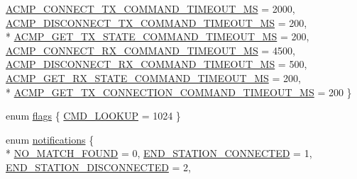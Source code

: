 \begin{DoxyCompactItemize}
\hyperlink{namespaceavdecc__lib_a5672955abd1a38146bde28647367857ead2c9cdd3767fdcfc7973bffe6fad27e6}{A\+C\+M\+P\+\_\+\+C\+O\+N\+N\+E\+C\+T\+\_\+\+T\+X\+\_\+\+C\+O\+M\+M\+A\+N\+D\+\_\+\+T\+I\+M\+E\+O\+U\+T\+\_\+\+MS} = 2000, 
\hyperlink{namespaceavdecc__lib_a5672955abd1a38146bde28647367857ea119f46688bfcc69a5bb7c9887a0fbe7e}{A\+C\+M\+P\+\_\+\+D\+I\+S\+C\+O\+N\+N\+E\+C\+T\+\_\+\+T\+X\+\_\+\+C\+O\+M\+M\+A\+N\+D\+\_\+\+T\+I\+M\+E\+O\+U\+T\+\_\+\+MS} = 200, 
\\*
\hyperlink{namespaceavdecc__lib_a5672955abd1a38146bde28647367857ea429b49b68e80bdbcc480d2b2ba663771}{A\+C\+M\+P\+\_\+\+G\+E\+T\+\_\+\+T\+X\+\_\+\+S\+T\+A\+T\+E\+\_\+\+C\+O\+M\+M\+A\+N\+D\+\_\+\+T\+I\+M\+E\+O\+U\+T\+\_\+\+MS} = 200, 
\hyperlink{namespaceavdecc__lib_a5672955abd1a38146bde28647367857ea6c03d3112f3139618f56b82329572bc4}{A\+C\+M\+P\+\_\+\+C\+O\+N\+N\+E\+C\+T\+\_\+\+R\+X\+\_\+\+C\+O\+M\+M\+A\+N\+D\+\_\+\+T\+I\+M\+E\+O\+U\+T\+\_\+\+MS} = 4500, 
\hyperlink{namespaceavdecc__lib_a5672955abd1a38146bde28647367857eaeaaa3d4bbcbc28fb10d8511ac3d590cc}{A\+C\+M\+P\+\_\+\+D\+I\+S\+C\+O\+N\+N\+E\+C\+T\+\_\+\+R\+X\+\_\+\+C\+O\+M\+M\+A\+N\+D\+\_\+\+T\+I\+M\+E\+O\+U\+T\+\_\+\+MS} = 500, 
\hyperlink{namespaceavdecc__lib_a5672955abd1a38146bde28647367857ea1686702fc28aaf14397624208eaab4e9}{A\+C\+M\+P\+\_\+\+G\+E\+T\+\_\+\+R\+X\+\_\+\+S\+T\+A\+T\+E\+\_\+\+C\+O\+M\+M\+A\+N\+D\+\_\+\+T\+I\+M\+E\+O\+U\+T\+\_\+\+MS} = 200, 
\\*
\hyperlink{namespaceavdecc__lib_a5672955abd1a38146bde28647367857eae76cd81da0e41f56dca5dc88dda423a1}{A\+C\+M\+P\+\_\+\+G\+E\+T\+\_\+\+T\+X\+\_\+\+C\+O\+N\+N\+E\+C\+T\+I\+O\+N\+\_\+\+C\+O\+M\+M\+A\+N\+D\+\_\+\+T\+I\+M\+E\+O\+U\+T\+\_\+\+MS} = 200
 \}
\item 
enum \hyperlink{namespaceavdecc__lib_ab6b306ef981f5e21bb41ea2c2dbe8cd9}{flags} \{ \hyperlink{namespaceavdecc__lib_ab6b306ef981f5e21bb41ea2c2dbe8cd9a3d122abbe03d5d839b4708ad02b7586d}{C\+M\+D\+\_\+\+L\+O\+O\+K\+UP} = 1024
 \}
\item 
enum \hyperlink{namespaceavdecc__lib_ad2a3e740ca3019cf9fd0f9514afb6419}{notifications} \{ \\*
\hyperlink{namespaceavdecc__lib_ad2a3e740ca3019cf9fd0f9514afb6419ad0504a48cf7cd6bd199c9ceffade00ca}{N\+O\+\_\+\+M\+A\+T\+C\+H\+\_\+\+F\+O\+U\+ND} = 0, 
\hyperlink{namespaceavdecc__lib_ad2a3e740ca3019cf9fd0f9514afb6419ad4731d551a9e3c927e75510fb78cbafb}{E\+N\+D\+\_\+\+S\+T\+A\+T\+I\+O\+N\+\_\+\+C\+O\+N\+N\+E\+C\+T\+ED} = 1, 
\hyperlink{namespaceavdecc__lib_ad2a3e740ca3019cf9fd0f9514afb6419ae810005d3610d3c3347fc283c40dab40}{E\+N\+D\+\_\+\+S\+T\+A\+T\+I\+O\+N\+\_\+\+D\+I\+S\+C\+O\+N\+N\+E\+C\+T\+ED} = 2, 

\end{DoxyCompactItemize}
